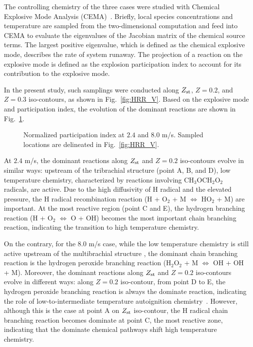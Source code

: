 \documentclass{wssci}
\begin{document}
The controlling chemistry of the three cases were studied with Chemical Explosive Mode Analysis (CEMA)~\cite{lu10,shan12}.   Briefly, local species concentrations and temperature are sampled from the two-dimensional computation and feed into CEMA to evaluate the eigenvalues of the Jacobian matrix of the chemical source terms.  The largest positive eigenvalue, which is defined as the chemical explosive mode, describes the rate of system runaway.  The projection of a reaction on the explosive mode is defined as the explosion participation index to account for its contribution to the explosive mode.

In the present study, such samplings were conducted along $Z_{\rm st}$, $Z = 0.2$, and $Z = 0.3$ iso-contours, as shown in Fig.~\ref{fig:HRR_V}.  Based on the explosive mode and participation index, the evolution of the dominant reactions are shown in Fig.~\ref{fig:CEMA_V}.

\begin{figure}
  \centering
  \scriptsize
  \resizebox{0.8\textwidth}{!}{}
  \resizebox{0.8\textwidth}{!}{}
  \normalsize
  \caption{Normalized participation index at $2.4$ and $8.0$ m/s.  Sampled locations are delineated in Fig.~\ref{fig:HRR_V}.}
  \label{fig:CEMA_V}
\end{figure}

At $2.4$ m/s, the dominant reactions along $Z_{\rm st}$ and $Z = 0.2$ iso-contours evolve in similar ways: upstream of the tribrachial structure (point A, B, and D), low temperature chemistry, characterized by reactions involving CH$_3$OCH$_2$O$_2$ radicals, are active.  Due to the high diffusivity of H radical and the elevated pressure, the H radical recombination reaction (H + O$_2$ + M $\Longleftrightarrow$ HO$_2$ + M) are important.  At the most reactive region (point C and E), the hydrogen branching reaction (H + O$_2$ $\Longleftrightarrow$ O + OH) becomes the most important chain branching reaction, indicating the transition to high temperature chemistry.

On the contrary, for the $8.0$ m/s case, while the low temperature chemistry is still active upstream of the multibrachial structure , the dominant chain branching reaction is the hydrogen peroxide branching reaction (H$_2$O$_2$ + M $\Longleftrightarrow$ OH + OH + M).  Moreover, the dominant reactions along $Z_{\rm st}$ and $Z = 0.2$ iso-contours evolve in different ways: along $Z = 0.2$ iso-contour, from point D to E, the hydrogen peroxide branching reaction is always the dominate reaction, indicating the role of low-to-intermediate temperature autoignition chemistry~\cite{westbrook00}.  However, although this is the case at point A on $Z_{\rm st}$ iso-contour, the H radical chain branching reaction becomes dominate at point C, the most reactive zone, indicating that the dominate chemical pathways shift high temperature chemistry.  
\end{document}

